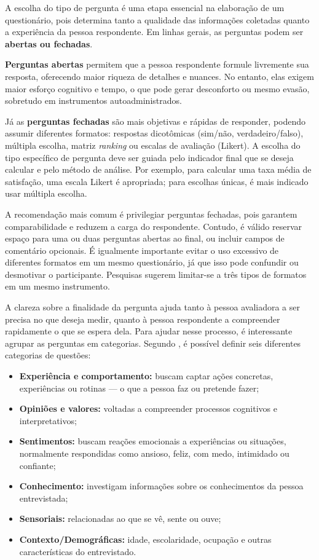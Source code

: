 \documentclass[12pt, a4paper, openany]{book}
\begin{document}
A escolha do tipo de pergunta \'e uma etapa essencial na elabora\c{c}\~ao de um question\'ario, pois determina tanto a qualidade das informa\c{c}\~oes coletadas quanto a experi\^encia da pessoa respondente. Em linhas gerais, as perguntas podem ser \textbf{abertas ou fechadas}.

\textbf{Perguntas abertas} permitem que a pessoa respondente formule livremente sua resposta, oferecendo maior riqueza de detalhes e nuances. No entanto, elas exigem maior esfor\c{c}o cognitivo e tempo, o que pode gerar desconforto ou mesmo evas\~ao, sobretudo em instrumentos autoadministrados.

J\'a as \textbf{perguntas fechadas} s\~ao mais objetivas e r\'apidas de responder, podendo assumir diferentes formatos: respostas dicot\^omicas (sim/n\~ao, verdadeiro/falso), m\'ultipla escolha, matriz \textit{ranking} ou escalas de avalia\c{c}\~ao (Likert). A escolha do tipo espec\'ifico de pergunta deve ser guiada pelo indicador final que se deseja calcular e pelo m\'etodo de an\'alise. Por exemplo, para calcular uma taxa m\'edia de satisfa\c{c}\~ao, uma escala Likert \'e apropriada; para escolhas \'unicas, \'e mais indicado usar m\'ultipla escolha.

A recomenda\c{c}\~ao mais comum \'e privilegiar perguntas fechadas, pois garantem comparabilidade e reduzem a carga do respondente. Contudo, \'e v\'alido reservar espa\c{c}o para uma ou duas perguntas abertas ao final, ou incluir campos de coment\'ario opcionais. \'E igualmente importante evitar o uso excessivo de diferentes formatos em um mesmo question\'ario, j\'a que isso pode confundir ou desmotivar o participante. Pesquisas sugerem limitar-se a tr\^es tipos de formatos em um mesmo instrumento.

A clareza sobre a finalidade da pergunta ajuda tanto \`a pessoa avaliadora a ser precisa no que deseja medir, quanto \`a pessoa respondente a compreender rapidamente o que se espera dela. Para ajudar nesse processo, \'e interessante agrupar as perguntas em categorias. Segundo \citet{patton2002qualitative}, \'e poss\'ivel definir seis diferentes categorias de quest\~oes:

\begin{itemize}
\item \textbf{Experi\^encia e comportamento:} buscam captar a\c{c}\~oes concretas, experi\^encias ou rotinas --- o que a pessoa faz ou pretende fazer;
\item \textbf{Opini\~oes e valores:} voltadas a compreender processos cognitivos e interpretativos;
\item \textbf{Sentimentos:} buscam rea\c{c}\~oes emocionais a experi\^encias ou situa\c{c}\~oes, normalmente respondidas como ansioso, feliz, com medo, intimidado ou confiante;
\item \textbf{Conhecimento:} investigam informa\c{c}\~oes sobre os conhecimentos da pessoa entrevistada;
\item \textbf{Sensoriais:} relacionadas ao que se v\^e, sente ou ouve;
\item \textbf{Contexto/Demogr\'aficas:} idade, escolaridade, ocupa\c{c}\~ao e outras caracter\'isticas do entrevistado.
\end{itemize}
\end{document}
